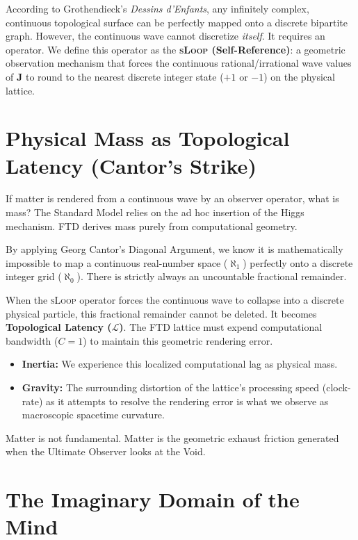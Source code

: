 \documentclass[11pt,twoside]{article}
\theoremstyle{remark}
\newcommand{\sLoop}{\textsc{sLoop}}
\begin{document}
According to Grothendieck's \emph{Dessins d'Enfants}, any infinitely complex, continuous topological surface can be perfectly mapped onto a discrete bipartite graph. However, the continuous wave cannot discretize \emph{itself}. It requires an operator. We define this operator as the \textbf{\sLoop{} (Self-Reference)}: a geometric observation mechanism that forces the continuous rational/irrational wave values of $\mathbf{J}$ to round to the nearest discrete integer state ($+1$ or $-1$) on the physical lattice.

\section{Physical Mass as Topological Latency (Cantor's Strike)}

If matter is rendered from a continuous wave by an observer operator, what is mass? The Standard Model relies on the ad hoc insertion of the Higgs mechanism. FTD derives mass purely from computational geometry.

By applying Georg Cantor's Diagonal Argument, we know it is mathematically impossible to map a continuous real-number space ($\aleph_1$) perfectly onto a discrete integer grid ($\aleph_0$). There is strictly always an uncountable fractional remainder.

When the \sLoop{} operator forces the continuous wave to collapse into a discrete physical particle, this fractional remainder cannot be deleted. It becomes \textbf{Topological Latency ($\mathcal{L}$)}. The FTD lattice must expend computational bandwidth ($C=1$) to maintain this geometric rendering error.

\begin{itemize}[leftmargin=2em]
    \item \textbf{Inertia:} We experience this localized computational lag as physical mass.
    \item \textbf{Gravity:} The surrounding distortion of the lattice's processing speed (clock-rate) as it attempts to resolve the rendering error is what we observe as macroscopic spacetime curvature.
\end{itemize}

Matter is not fundamental. Matter is the geometric exhaust friction generated when the Ultimate Observer looks at the Void.

\section{The Imaginary Domain of the Mind}
\end{document}
